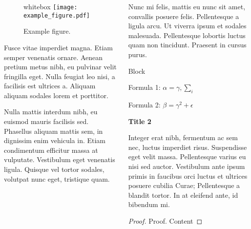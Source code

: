 \documentclass{beamer}
\begin{document}
\begin{frame}[t]
\begin{columns}[t]
\begin{column}{.49\textwidth}
		\begin{figure}
		\begin{beamercolorbox}{whitebox}
		\centering
		\texttt{[image: example\_figure.pdf]}

		\caption{Example figure.}
		\end{beamercolorbox}
		\end{figure}

	Fusce vitae imperdiet magna. Etiam semper venenatis ornare. Aenean pretium metus nibh, eu pulvinar velit fringilla eget. Nulla feugiat leo nisi, a facilisis est ultrices a. Aliquam aliquam sodales lorem et porttitor. 
	
	\vspace{0.5em}
	Nulla mattis interdum nibh, eu euismod mauris facilisis sed. Phasellus aliquam mattis sem, in dignissim enim vehicula in. Etiam condimentum efficitur massa at vulputate. Vestibulum eget venenatis ligula. Quisque vel tortor sodales, volutpat nunc eget, tristique quam.
	\end{column}


	\begin{column}{.49\textwidth}
		\justifying
		Nunc mi felis, mattis eu nunc sit amet, convallis posuere felis. Pellentesque a ligula arcu. Ut viverra ipsum et sodales malesuada. Pellentesque lobortis luctus quam non tincidunt. Praesent in cursus purus. 
		
			\begin{block}{Block}
			\begin{center}
			Formula 1: \hspace{2em}	$\alpha=\gamma, \sum_{i}$
			
			Formula 2:	\hspace{2em} $\beta=\gamma^2+\epsilon$
			\end{center}
			\end{block}
	
		\vspace{0.5em}
		{\bfseries Title 2}
		
		Integer erat nibh, fermentum ac sem nec, luctus imperdiet risus. Suspendisse eget velit massa. Pellentesque varius eu nisi sed auctor. Vestibulum ante ipsum primis in faucibus orci luctus et ultrices posuere cubilia Curae; Pellentesque a blandit tortor. In at eleifend ante, id bibendum mi. 
		
		\begin{proof}{Proof.}
		Content
		\end{proof}
		

\end{column}
\end{columns}
\end{frame}
\end{document}

